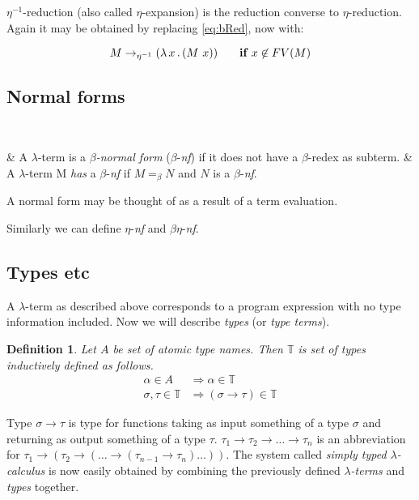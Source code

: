 \documentclass{sig-alternate}
\newtheorem{definition}{Definition}
\newcommand{\lterm}{$\lambda$-term\xspace}
\newcommand{\lterms}{$\lambda$-terms\xspace}
\newcommand{\then}{\Rightarrow\xspace}
\newcommand{\lamb}[2]{( \lambda \, #1 \, . \, #2 )}
\newcommand{\beq}{=_\beta}
\newcommand{\bnf}{$\beta$-\textit{nf}\xspace}
\newcommand{\enf}{$\eta$-\textit{nf}\xspace}
\newcommand{\benf}{$\beta\eta$-\textit{nf}\xspace}
\newcommand{\ar}{\rightarrow\xspace}
\newcommand{\T}{\mathbb{T}\xspace}
\begin{document}
$\eta^{-1}$-reduction (also called $\eta$-expansion) is 
the reduction converse to $\eta$-reduction.
Again it may be obtained by replacing \ref{eq:bRed}, now with:  

$$M \eeArrow \lamb{x}{(M~x)} \textbf{ ~~~~if } x \not\in FV(M) $$




\subsection{Normal forms}

~\begin{easylist}[enumerate]
& A \lterm is a \textit{$\beta$-normal form} (\bnf) 
if it does not have a $\beta$-redex as subterm.
& A \lterm M \textit{has} a \bnf if $M \beq N$
and $N$ is a \bnf.\\
\end{easylist}
A normal form may be thought of as a result of a term evaluation. 

Similarly we can define \enf and \benf.



\subsection{Types etc}

A \lterm as described above
corresponds to a program expression with no type information
included. Now we will describe \textit{types} (or \textit{type terms}).

\begin{definition}
Let $A$ be set of {\it atomic type names}. 
Then $\mathbb{T}$ is set of {\it types} inductively defined as follows.
\begin{align*}
\alpha      \in A  &\then   \alpha \in \T \\
\sigma,\tau \in \T &\then ( \sigma \ar  \tau ) \in \T 
\end{align*}
\end{definition}


Type $\sigma \ar \tau$ is type for functions taking as input
something of a type $\sigma$ and returning 
as output something of a type $\tau$. 
$\tau_1 \ar \tau_2 \ar \dots \ar \tau_n$ is an abbreviation for 
$\tau_1 \ar (\tau_2 \ar (\dots \ar (\tau_{n-1} \ar \tau_n)\dots))$.
The system called \textit{simply typed $\lambda$-calculus} is now easily obtained by
combining the previously defined \textit{\lterms} and \textit{types} together.
\end{document}
